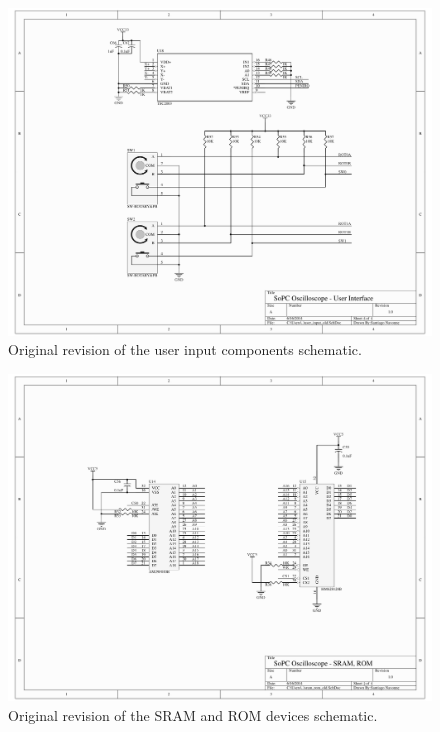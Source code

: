\documentclass[titlepage]{scrartcl}
\begin{document}
\begin{appendices}
	\begin{figure}[h!]
	\vspace{-2cm}
	\centerline{\includegraphics[width=26cm, angle=90, origin=c]{img/user_input_old.pdf}}
                	\caption{Original revision of the user input components schematic.}
               	\label{fig:orig_schem_3}
	\end{figure}

	\begin{figure}[h!]
	\vspace{-2cm}
	\centerline{\includegraphics[width=26cm, angle=90, origin=c]{img/sram_rom_old.pdf}}
                	\caption{Original revision of the SRAM and ROM devices schematic.}
               	\label{fig:orig_schem_4}
	\end{figure}


\end{appendices}
\end{document}
